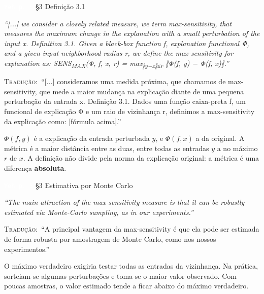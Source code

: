 \documentclass[11pt,a4paper]{article}
\newcommand{\pagechip}[1]{{\setlength{\fboxsep}{1.5pt}\colorbox{cAcc}{\textcolor{white}{\scriptsize\texttt{#1}}}}}
\newenvironment{origquote}{\par\itshape\small}{\par}
\newenvironment{tradquote}{\par\small\textsc{Tradução:}\ }{\par}
\newcommand{\explab}[1]{\par\smallskip{\small\color{cAcc}\textbf{\MakeUppercase{#1}}}\par}
\begin{document}
\begin{citacard}{\pagechip{Yeh p. 5} §3 Definição 3.1}
\begin{origquote}“[...] we consider a closely related measure, we term max-sensitivity, that measures the maximum change in the explanation with a small perturbation of the input x. Definition 3.1. Given a black-box function f, explanation functional Φ, and a given input neighborhood radius r, we define the max-sensitivity for explanation as: SENS\textsubscript{MAX}(Φ, f, x, r) = max\textsubscript{‖y−x‖≤r} ‖Φ(f, y) − Φ(f, x)‖.”\end{origquote}
\begin{tradquote}“[...] consideramos uma medida próxima, que chamamos de max-sensitivity, que mede a maior mudança na explicação diante de uma pequena perturbação da entrada x. Definição 3.1. Dados uma função caixa-preta f, um funcional de explicação Φ e um raio de vizinhança r, definimos a max-sensitivity da explicação como: [fórmula acima].”\end{tradquote}
\explab{Explicação}
$\Phi(f, y)$ é a explicação da entrada perturbada $y$, e $\Phi(f, x)$ a da original. A métrica é a maior distância entre as duas, entre todas as entradas $y$ a no máximo $r$ de $x$. A definição não divide pela norma da explicação original: a métrica é uma diferença \textbf{absoluta}.
\end{citacard}

\begin{citacard}{\pagechip{Yeh p. 5} §3 Estimativa por Monte Carlo}
\begin{origquote}“The main attraction of the max-sensitivity measure is that it can be robustly estimated via Monte-Carlo sampling, as in our experiments.”\end{origquote}
\begin{tradquote}“A principal vantagem da max-sensitivity é que ela pode ser estimada de forma robusta por amostragem de Monte Carlo, como nos nossos experimentos.”\end{tradquote}
\explab{Explicação}
O máximo verdadeiro exigiria testar todas as entradas da vizinhança. Na prática, sorteiam-se algumas perturbações e toma-se o maior valor observado. Com poucas amostras, o valor estimado tende a ficar abaixo do máximo verdadeiro.
\end{citacard}
\end{document}
